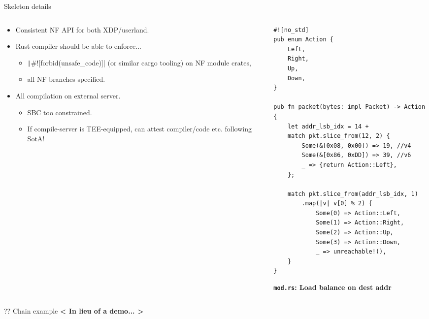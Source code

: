 \documentclass[aspectratio=169,xcolor={dvipsnames}
,handout
]{beamer}
\begin{document}
\begin{frame}[fragile=singleslide]{Skeleton details}
	\begin{columns}
		\begin{column}{0.5\linewidth}
			\begin{itemize}
				\item Consistent NF API for both XDP/userland.
				\item Rust compiler should be able to enforce...
				\begin{itemize}
					\item \texttt|#![forbid(unsafe_code)]| (or similar cargo tooling) on NF module crates,
					\item all NF branches specified.
				\end{itemize}
				\item All compilation on external server.
				\begin{itemize}
					\item SBC too constrained.
					\item If compile-server is TEE-equipped, \alert{can attest compiler/code} etc. following SotA!
				\end{itemize}
			\end{itemize}
		\end{column}
		\begin{column}{0.5\linewidth}
			\centering
			\begin{verbatim}
#![no_std]
pub enum Action {
	Left,
	Right,
	Up,
	Down,
}
				
pub fn packet(bytes: impl Packet) -> Action {
	let addr_lsb_idx = 14 +
	match pkt.slice_from(12, 2) {
		Some(&[0x08, 0x00]) => 19, //v4
		Some(&[0x86, 0xDD]) => 39, //v6
		_ => {return Action::Left},
	};
	
	match pkt.slice_from(addr_lsb_idx, 1)
		.map(|v| v[0] % 2) {
			Some(0) => Action::Left,
			Some(1) => Action::Right,
			Some(2) => Action::Up,
			Some(3) => Action::Down,
			_ => unreachable!(),
	}
}
			\end{verbatim}
			\textbf{\texttt{mod.rs}: Load balance on dest addr}
		\end{column}
	\end{columns}
\end{frame}

\begin{frame}{?? Chain example}
	\centering
	\textbf{\alert{< In lieu of a demo... >}}
\end{frame}
\end{document}
